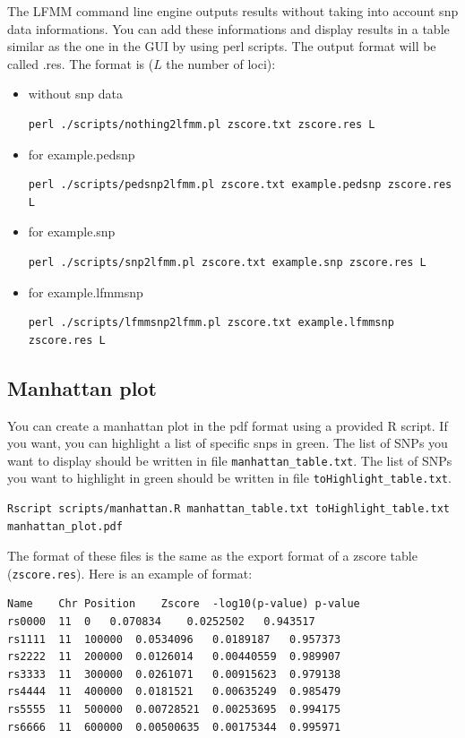 \documentclass[10pt,a4paper]{article}
\begin{document}
The LFMM command line engine outputs results without taking into account snp data informations.
You can add these informations and display results in a table similar as the one in the GUI
by using perl scripts. The output format will be called .res.
The format is ($L$ the number of loci):
\begin{itemize}
\item without snp data
\begin{Verbatim}[frame=single]
perl ./scripts/nothing2lfmm.pl zscore.txt zscore.res L
\end{Verbatim}
\item for example.pedsnp
\begin{Verbatim}[frame=single]
perl ./scripts/pedsnp2lfmm.pl zscore.txt example.pedsnp zscore.res L
\end{Verbatim}
\item for example.snp
\begin{Verbatim}[frame=single]
perl ./scripts/snp2lfmm.pl zscore.txt example.snp zscore.res L
\end{Verbatim}
\item for example.lfmmsnp
\begin{Verbatim}[frame=single]
perl ./scripts/lfmmsnp2lfmm.pl zscore.txt example.lfmmsnp zscore.res L
\end{Verbatim}
\end{itemize}

\subsection{Manhattan plot}

You can create a manhattan plot in the pdf format using a provided R script. If you want, you can
highlight a list of specific snps in green. 
The list of SNPs you want to display should be written in file \verb|manhattan_table.txt|. The list of
SNPs you want to highlight in green should be written in file \verb|toHighlight_table.txt|.
\begin{Verbatim}[frame=single]
Rscript scripts/manhattan.R manhattan_table.txt toHighlight_table.txt manhattan_plot.pdf
\end{Verbatim}
The format of these files is the same as the export format of a zscore table (\verb|zscore.res|).
Here is an example of format:
\begin{center}
\footnotesize
\begin{Verbatim}[frame=single]
Name	Chr	Position	Zscore	-log10(p-value) p-value
rs0000	11	0	0.070834	0.0252502	0.943517
rs1111	11	100000	0.0534096	0.0189187	0.957373
rs2222	11	200000	0.0126014	0.00440559	0.989907
rs3333	11	300000	0.0261071	0.00915623	0.979138
rs4444	11	400000	0.0181521	0.00635249	0.985479
rs5555	11	500000	0.00728521	0.00253695	0.994175
rs6666	11	600000	0.00500635	0.00175344	0.995971
\end{Verbatim}
\end{center}
\end{document}
